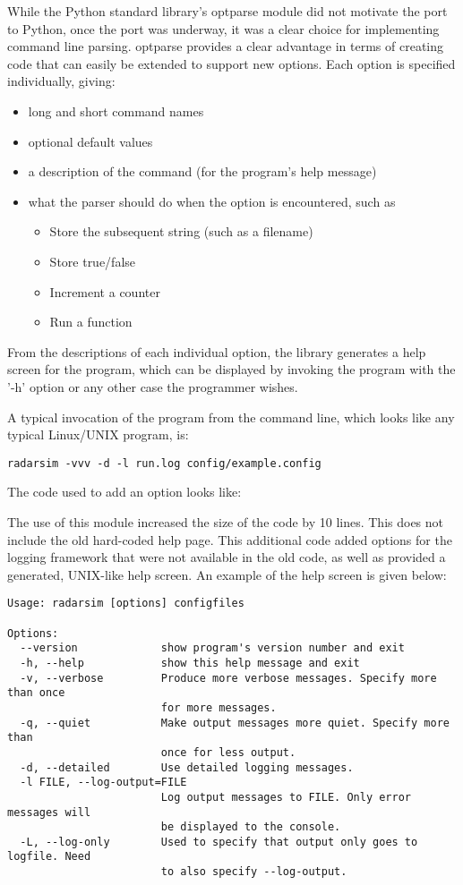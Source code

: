 \documentclass[twocolumn]{article}
\begin{document}
While the Python standard library's optparse module did not motivate the port
to Python, once the port was underway, it was a clear choice for implementing
command line parsing. optparse provides a clear advantage in terms of creating
code that can easily be extended to support new options.  Each option is specified
individually, giving:
\begin{itemize}
    \item long and short command names
    \item optional default values
    \item a description of the command (for the program's help message)
    \item what the parser should do when the option is encountered, such as
    \begin{itemize}
        \item Store the subsequent string (such as a filename)
        \item Store true/false
        \item Increment a counter
        \item Run a function
    \end{itemize}
\end{itemize}
From the descriptions of each individual option, the library generates a
help screen for the program, which can be displayed by invoking the program
with the '-h' option or any other case the programmer wishes.

A typical invocation of the program from the command line, which looks like
any typical Linux/UNIX program, is:

{\scriptsize\verb$radarsim -vvv -d -l run.log config/example.config$}

The code used to add an option looks like:

\lstset{language=Python}


The use of this module increased the size of the code by 10 lines. This does
not include the old hard-coded help page. This additional code added options
for the logging framework that were not available in the old code, as well
as provided a generated, UNIX-like help screen. An example of the help screen
is given below:

{\tiny
\begin{verbatim}
Usage: radarsim [options] configfiles

Options:
  --version             show program's version number and exit
  -h, --help            show this help message and exit
  -v, --verbose         Produce more verbose messages. Specify more than once
                        for more messages.
  -q, --quiet           Make output messages more quiet. Specify more than
                        once for less output.
  -d, --detailed        Use detailed logging messages.
  -l FILE, --log-output=FILE
                        Log output messages to FILE. Only error messages will
                        be displayed to the console.
  -L, --log-only        Used to specify that output only goes to logfile. Need
                        to also specify --log-output.
\end{verbatim}}
\end{document}
